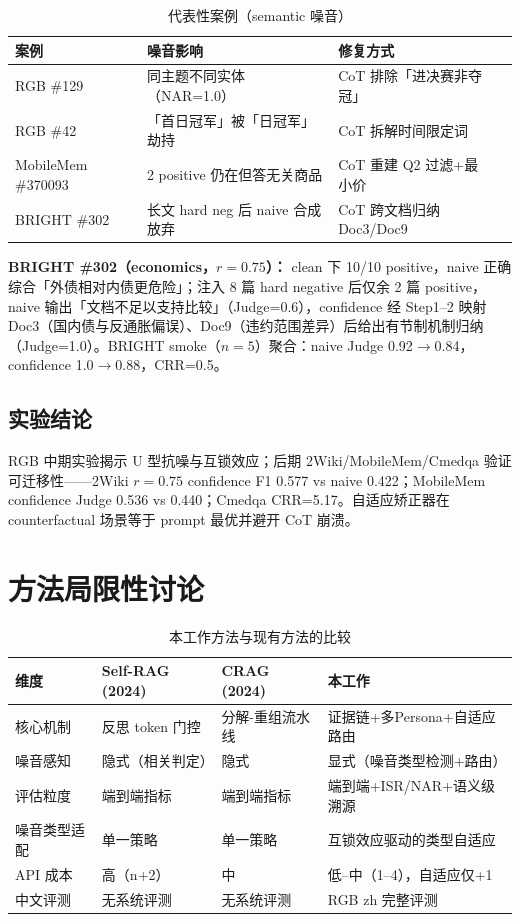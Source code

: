 \documentclass[UTF8,zihao=-4]{ctexart}
\begin{document}
\begin{table}[H]
  \centering
  \caption{代表性案例（semantic 噪音）}
  \label{tab:case_studies}
  \small
  \begin{tabularx}{\textwidth}{lYYY}
    \toprule
    案例 & 噪音影响 & 修复方式 \\
    \midrule
    RGB \#129 & 同主题不同实体（NAR=1.0） & CoT 排除「进决赛非夺冠」 \\
    RGB \#42 & 「首日冠军」被「日冠军」劫持 & CoT 拆解时间限定词 \\
    MobileMem \#370093 & 2 positive 仍在但答无关商品 & CoT 重建 Q2 过滤+最小价 \\
    BRIGHT \#302 & 长文 hard neg 后 naive 合成放弃 & CoT 跨文档归纳 Doc3/Doc9 \\
    \bottomrule
  \end{tabularx}
\end{table}

\textbf{BRIGHT \#302（economics，$r=0.75$）：} clean 下 10/10 positive，naive 正确综合「外债相对内债更危险」；注入 8 篇 hard negative 后仅余 2 篇 positive，naive 输出「文档不足以支持比较」（Judge=0.6），confidence 经 Step1--2 映射 Doc3（国内债与反通胀偏误）、Doc9（违约范围差异）后给出有节制机制归纳（Judge=1.0）。BRIGHT smoke（$n=5$）聚合：naive Judge 0.92$\rightarrow$0.84，confidence 1.0$\rightarrow$0.88，CRR=0.5。

\subsection{实验结论}
RGB 中期实验揭示 U 型抗噪与互锁效应；后期 2Wiki/MobileMem/Cmedqa 验证可迁移性——2Wiki $r=0.75$ confidence F1 0.577 vs naive 0.422；MobileMem confidence Judge 0.536 vs 0.440；Cmedqa CRR=5.17。自适应矫正器在 counterfactual 场景等于 prompt 最优并避开 CoT 崩溃。

\section{方法局限性讨论}

\begin{table}[H]
  \centering
  \caption{本工作方法与现有方法的比较}
  \begin{tabularx}{\textwidth}{lYYY}
    \toprule
    维度 & Self-RAG (2024) & CRAG (2024) & 本工作 \\
    \midrule
    核心机制 & 反思 token 门控 & 分解-重组流水线 & 证据链+多Persona+自适应路由 \\
    噪音感知 & 隐式（相关判定） & 隐式 & 显式（噪音类型检测+路由） \\
    评估粒度 & 端到端指标 & 端到端指标 & 端到端+ISR/NAR+语义级溯源 \\
    噪音类型适配 & 单一策略 & 单一策略 & 互锁效应驱动的类型自适应 \\
    API 成本 & 高（n+2） & 中 & 低--中（1--4），自适应仅+1 \\
    中文评测 & 无系统评测 & 无系统评测 & RGB zh 完整评测 \\
    \bottomrule
  \end{tabularx}
\end{table}
\end{document}
